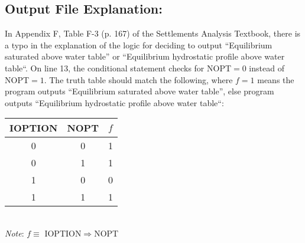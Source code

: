 \documentclass[11pt,fleqn]{article}
\newcommand{\indentpar}{\phantom{=}}
\begin{document}
    \subsection*{Output File Explanation:}
    \indentpar In Appendix F, Table F-3 (p. 167) of the Settlements Analysis Textbook,
    there is a typo in the explanation of the logic for deciding to output “Equilibrium 
    saturated above water table” or “Equilibrium hydrostatic profile above water table“.
    On line 13, the conditional statement checks for NOPT$=0$ instead of NOPT$=1$. The 
    truth table should match the following, where $f=1$ means the program outputs “Equilibrium 
    saturated above water table”, else program outputs “Equilibrium hydrostatic profile above 
    water table“:
    \begin{center}
        \begin{tabular}{|c|c|c|}
            \hline 
            IOPTION & NOPT & $f$ \\
            \hline 
            0 & 0 & 1 \\
            \hline
            0 & 1 & 1 \\
            \hline 
            1 & 0 & 0 \\
            \hline 
            1 & 1 & 1 \\
            \hline
        \end{tabular}
        \\
        \medskip
        \textit{Note}: $f \equiv$ IOPTION$\Rightarrow$NOPT  
    \end{center}
     
\end{document}
